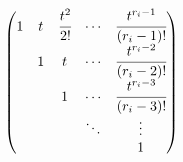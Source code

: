 {\begin{solution}
\begin{align*}
\begin{pmatrix}
                                                                                       1 & t & \cfrac{t^2}{2!} & \cdots & \cfrac{t^{r_i-1}}{\left(r_i-1\right)!}  \\
                                                                                         & 1 & t               & \cdots & \cfrac{t^{r_i-2}}{\left(r_i-2\right)!}  \\
                                                                                         &   & 1               & \cdots & \cfrac{t^{r_i-3}}{\left(r_i-3 \right)!} \\
                                                                                         &   &                 & \ddots & \vdots                                  \\
                                                                                         &   &                 &        & 1
                                                                                   \end{pmatrix}
    \end{align*}
\end{solution}
}